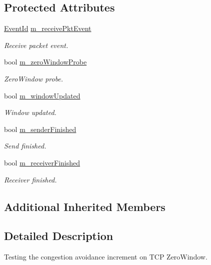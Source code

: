 \subsection*{Protected Attributes}
\begin{DoxyCompactItemize}
\item 
\hyperlink{classns3_1_1EventId}{Event\+Id} \hyperlink{classTcpZeroWindowTest_abe00925a77cf14a65c1c9d77154ac0f6}{m\+\_\+receive\+Pkt\+Event}
\begin{DoxyCompactList}\small\item\em Receive packet event. \end{DoxyCompactList}\item 
bool \hyperlink{classTcpZeroWindowTest_aa34edd5e5e001d0ac86a213dfd4ab1ab}{m\+\_\+zero\+Window\+Probe}
\begin{DoxyCompactList}\small\item\em Zero\+Window probe. \end{DoxyCompactList}\item 
bool \hyperlink{classTcpZeroWindowTest_a29625fe07d920a3cb28a30e7f73ba500}{m\+\_\+window\+Updated}
\begin{DoxyCompactList}\small\item\em Window updated. \end{DoxyCompactList}\item 
bool \hyperlink{classTcpZeroWindowTest_a580deac0b590a79aae8eae4c5770d789}{m\+\_\+sender\+Finished}
\begin{DoxyCompactList}\small\item\em Send finished. \end{DoxyCompactList}\item 
bool \hyperlink{classTcpZeroWindowTest_a66d629347820b9ddc220cf8945a92aea}{m\+\_\+receiver\+Finished}
\begin{DoxyCompactList}\small\item\em Receiver finished. \end{DoxyCompactList}\end{DoxyCompactItemize}
\subsection*{Additional Inherited Members}


\subsection{Detailed Description}
Testing the congestion avoidance increment on T\+CP Zero\+Window. 

